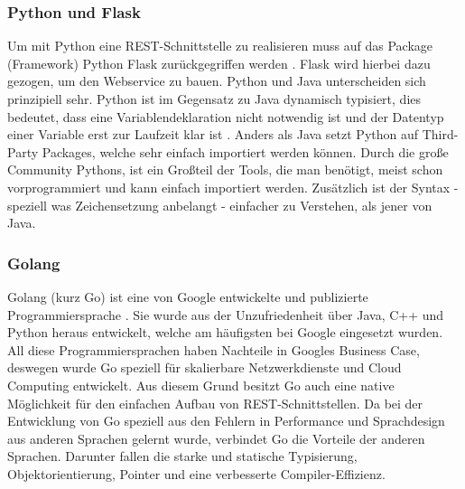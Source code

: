		\subsubsection{Python und Flask}
		Um mit Python eine REST-Schnittstelle zu realisieren muss auf das Package (Framework) Python Flask zurückgegriffen werden \cite{flaskDocs}. Flask wird hierbei dazu gezogen, um den Webservice zu bauen. Python und Java unterscheiden sich prinzipiell sehr. Python ist im Gegensatz zu Java dynamisch typisiert, dies bedeutet, dass eine Variablendeklaration nicht notwendig ist und der Datentyp einer Variable erst zur Laufzeit klar ist \cite{pythonDocs}. Anders als Java setzt Python auf Third-Party Packages, welche sehr einfach importiert werden können. Durch die große Community Pythons, ist ein Großteil der Tools, die man benötigt, meist schon vorprogrammiert und kann einfach importiert werden. Zusätzlich ist der Syntax - speziell was Zeichensetzung anbelangt - einfacher zu Verstehen, als jener von Java.
		
		\subsubsection{Golang}
		Golang (kurz Go) ist eine von Google entwickelte und publizierte Programmiersprache \cite{goDocs}. Sie wurde aus der Unzufriedenheit über Java, C++ und Python heraus entwickelt, welche am häufigsten bei Google eingesetzt wurden. All diese Programmiersprachen haben Nachteile in Googles Business Case, deswegen wurde Go speziell für skalierbare Netzwerkdienste und Cloud Computing entwickelt. Aus diesem Grund besitzt Go auch eine native Möglichkeit für den einfachen Aufbau von REST-Schnittstellen. Da bei der Entwicklung von Go speziell aus den Fehlern in Performance und Sprachdesign aus anderen Sprachen gelernt wurde, verbindet Go die Vorteile der anderen Sprachen. Darunter fallen die starke und statische Typisierung, Objektorientierung, Pointer und eine verbesserte Compiler-Effizienz.
